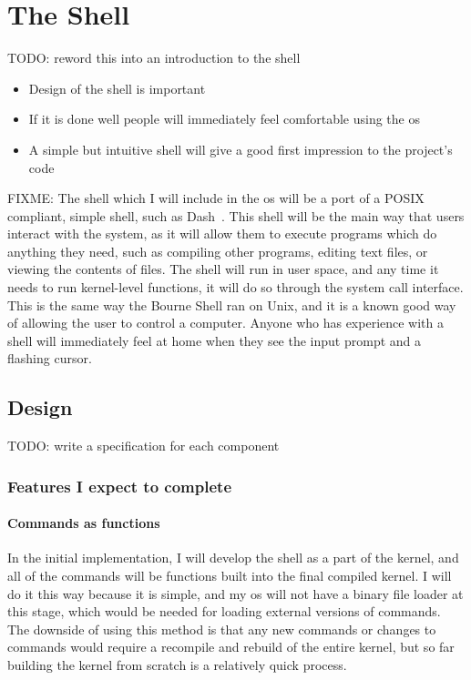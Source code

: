 \documentclass{article}
\begin{document}
\section{The Shell}
TODO: reword this into an introduction to the shell

\begin{itemize}
    \item Design of the shell is important
    \item If it is done well people will immediately feel comfortable using the
        \gls{os}
    \item A simple but intuitive shell will give a good first impression to the
        project's code
\end{itemize}

FIXME:
The shell which I will include in the \gls{os} will be a port of a POSIX
compliant, simple shell, such as Dash~\cite{dash-shell}. This shell will be the
main way that users interact with the system, as it will allow them to execute
programs which do anything they need, such as compiling other programs, editing
text files, or viewing the contents of files. The shell will run in user space,
and any time it needs to run kernel-level functions, it will do so through the
system call interface. This is the same way the Bourne Shell ran on Unix, and
it is a known good way of allowing the user to control a computer. Anyone who
has experience with a shell will immediately feel at home when they see the
input prompt and a flashing cursor.

\subsection{Design}

TODO: write a specification for each component
\subsubsection{Features I expect to complete}

\paragraph{Commands as functions}
In the initial implementation, I will develop the shell as a part of the
kernel, and all of the commands will be functions built into the final compiled
kernel. I will do it this way because it is simple, and my \gls{os} will not
have a binary file loader at this stage, which would be needed for loading
external versions of commands. The downside of using this method is that any
new commands or changes to commands would require a recompile and rebuild of
the entire kernel, but so far building the kernel from scratch is a relatively
quick process.
\end{document}
